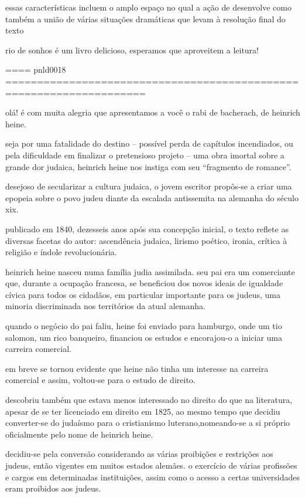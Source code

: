 essas características incluem o amplo espaço no qual a ação de desenvolve  como também a união de várias situações dramáticas  que levam à resolução final do texto 

rio de sonhos é um livro delicioso,  esperamos que aproveitem a leitura! 

==== pnld0018 ====================================================================

olá! é com muita alegria que apresentamos a você o rabi de bacherach, de heinrich heine.

seja por uma fatalidade do destino – possível perda de capítulos incendiados, ou pela dificuldade em finalizar o pretensioso projeto – uma obra imortal sobre a grande dor judaica, heinrich heine nos instiga com seu “fragmento de romance”.

desejoso de secularizar a cultura judaica, o jovem escritor propôs-se a criar uma epopeia sobre o povo judeu diante da escalada antissemita na alemanha do século xix.


publicado em 1840, dezesseis anos após sua concepção inicial, o texto reflete as diversas facetas do autor:
ascendência judaica, lirismo poético, ironia, crítica à religião e índole revolucionária.


heinrich heine nasceu numa família judia assimilada. seu pai era um comerciante que, durante a ocupação francesa, se beneficiou dos novos ideais de igualdade cívica para todos os cidadãos, em particular importante para os judeus, uma minoria discriminada nos territórios da atual alemanha. 

quando o negócio do pai faliu, heine foi enviado para hamburgo, onde um tio salomon, um rico banqueiro, financiou os estudos e encorajou-o a iniciar uma carreira comercial.

em breve se tornou evidente que heine não tinha um interesse na carreira comercial e assim, voltou-se para o estudo de direito. 

descobriu também que estava menos interessado no direito do que na literatura, apesar de se ter licenciado em direito em 1825, ao mesmo tempo que decidiu converter-se do judaísmo para o cristianismo luterano,nomeando-se a si próprio oficialmente pelo nome de heinrich heine.

decidiu-se pela conversão considerando as várias proibições e restrições aos judeus, então vigentes em muitos estados alemães. o exercício de várias profissões e cargos em determinadas instituições, assim como o acesso a certas universidades eram proibidos aos judeus. 

